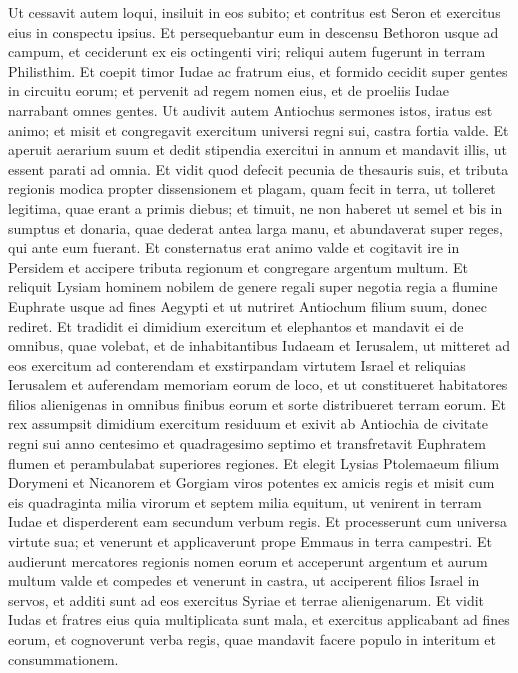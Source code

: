 \begin{biblechapter}
\verse Ut cessavit autem loqui, insiluit in eos subito; et contritus est Seron et exercitus eius in conspectu ipsius. 
\verse Et persequebantur eum in descensu Bethoron usque ad campum, et ceciderunt ex eis octingenti viri; reliqui autem fugerunt in terram Philisthim. 
\verse Et coepit timor Iudae ac fratrum eius, et formido cecidit super gentes in circuitu eorum; 
\verse et pervenit ad regem nomen eius, et de proeliis Iudae narrabant omnes gentes. 
\verse Ut audivit autem Antiochus sermones istos, iratus est animo; et misit et congregavit exercitum universi regni sui, castra fortia valde. 
\verse Et aperuit aerarium suum et dedit stipendia exercitui in annum et mandavit illis, ut essent parati ad omnia. 
\verse Et vidit quod defecit pecunia de thesauris suis, et tributa regionis modica propter dissensionem et plagam, quam fecit in terra, ut tolleret legitima, quae erant a primis diebus; 
\verse et timuit, ne non haberet ut semel et bis in sumptus et donaria, quae dederat antea larga manu, et abundaverat super reges, qui ante eum fuerant. 
\verse Et consternatus erat animo valde et cogitavit ire in Persidem et accipere tributa regionum et congregare argentum multum. 
\verse Et reliquit Lysiam hominem nobilem de genere regali super negotia regia a flumine Euphrate usque ad fines Aegypti 
\verse et ut nutriret Antiochum filium suum, donec rediret. 
\verse Et tradidit ei dimidium exercitum et elephantos et mandavit ei de omnibus, quae volebat, et de inhabitantibus Iudaeam et Ierusalem, 
\verse ut mitteret ad eos exercitum ad conterendam et exstirpandam virtutem Israel et reliquias Ierusalem et auferendam memoriam eorum de loco, 
\verse et ut constitueret habitatores filios alienigenas in omnibus finibus eorum et sorte distribueret terram eorum. 
\verse Et rex assumpsit dimidium exercitum residuum et exivit ab Antiochia de civitate regni sui anno centesimo et quadragesimo septimo et transfretavit Euphratem flumen et perambulabat superiores regiones. 
\verse Et elegit Lysias Ptolemaeum filium Dorymeni et Nicanorem et Gorgiam viros potentes ex amicis regis 
\verse et misit cum eis quadraginta milia virorum et septem milia equitum, ut venirent in terram Iudae et disperderent eam secundum verbum regis. 
\verse Et processerunt cum universa virtute sua; et venerunt et applicaverunt prope Emmaus in terra campestri. 
\verse Et audierunt mercatores regionis nomen eorum et acceperunt argentum et aurum multum valde et compedes et venerunt in castra, ut acciperent filios Israel in servos, et additi sunt ad eos exercitus Syriae et terrae alienigenarum. 
\verse Et vidit Iudas et fratres eius quia multiplicata sunt mala, et exercitus applicabant ad fines eorum, et cognoverunt verba regis, quae mandavit facere populo in interitum et consummationem. 

\end{biblechapter}
